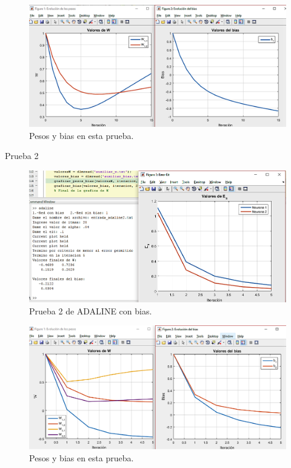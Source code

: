 \documentclass[12pt, titlepage]{article}
\begin{document}
            \begin{figure}[H]
                \begin{center}
                    \includegraphics[width=16cm]{img/adaline1/pesosbias.png}
                    \caption{Pesos y bias en esta prueba.}
                    \label{fig:adaline1pesos}
                \end{center}
            \end{figure}
        Prueba 2
        \begin{figure}[H]
            \begin{center}
                \includegraphics[width=16cm]{img/adaline2/error.png}
                \caption{Prueba 2 de ADALINE con bias.}
                \label{fig:adaline2error}
            \end{center}
        \end{figure}
        
        \begin{figure}[H]
            \begin{center}
                \includegraphics[width=16cm]{img/adaline2/pesosbias.png}
                \caption{Pesos y bias en esta prueba.}
                \label{fig:adaline2pesos}
            \end{center}
        \end{figure}
\end{document}
